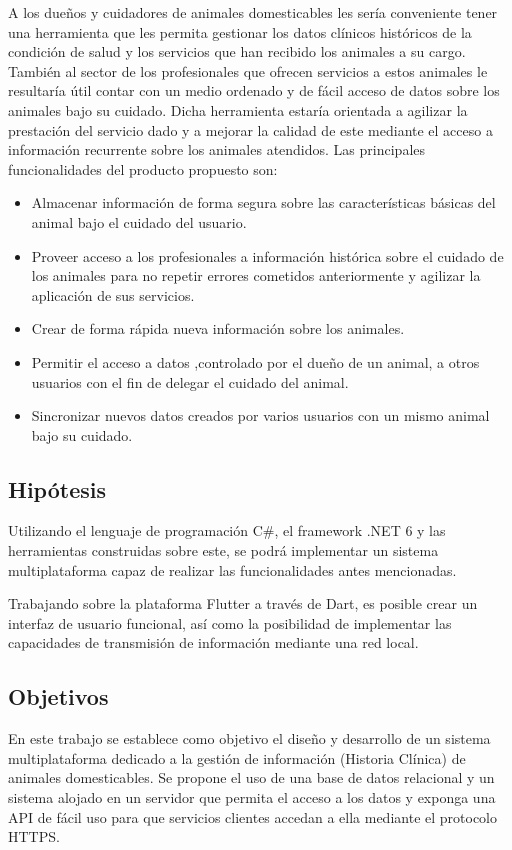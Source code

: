 A los dueños y cuidadores de animales domesticables les sería conveniente tener una herramienta que les permita gestionar los datos clínicos históricos de la condición de salud y los servicios que han recibido los animales a su cargo. También al sector de los profesionales que ofrecen servicios a estos animales le resultaría útil contar con un medio ordenado y de fácil acceso de datos sobre los animales bajo su cuidado. Dicha herramienta estaría orientada a agilizar la prestación del servicio dado y a mejorar la calidad de este mediante el acceso a información recurrente sobre los animales atendidos. Las principales funcionalidades del producto propuesto son:
\begin{itemize}
\item Almacenar información de forma segura sobre las características básicas del animal bajo el cuidado del usuario.
\item Proveer acceso a los profesionales a información histórica sobre el cuidado de los animales para no repetir errores cometidos anteriormente y agilizar la aplicación de sus servicios.
\item Crear de forma rápida nueva información sobre los animales.
\item Permitir el acceso a datos ,controlado por el dueño de un animal, a otros usuarios con el fin de delegar el cuidado del animal.
\item Sincronizar nuevos datos creados por varios usuarios con un mismo animal bajo su cuidado.
\end{itemize}

\subsection*{Hip\'otesis}
Utilizando el lenguaje de programación C\#, el framework .NET 6 y las herramientas construidas sobre este, se podrá implementar un sistema multiplataforma capaz de realizar las funcionalidades antes mencionadas.

Trabajando sobre la plataforma Flutter a trav\'es de Dart, es posible crear un interfaz de usuario funcional, as\'i como la posibilidad de implementar las capacidades de transmisi\'on de informaci\'on mediante una red local.

\subsection*{Objetivos}

En este trabajo se establece como objetivo el diseño y desarrollo de un sistema multiplataforma dedicado a la gestión de información (Historia Clínica) de animales domesticables. Se propone el uso de una base de datos relacional y un sistema alojado en un servidor que permita el acceso a los datos y exponga una API de fácil uso para que servicios clientes accedan a ella mediante el protocolo HTTPS.


